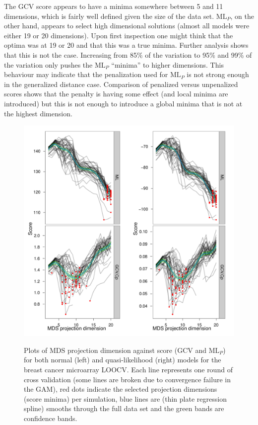 The GCV score appears to have a minima somewhere between 5 and 11 dimensions, which is fairly well defined given the size of the data set.  $\text{ML}_P$, on the other hand, appears to select high dimensional solutions (almost all models were either 19 or 20 dimensions). Upon first inspection one might think that the optima was at 19 or 20 and that this was a true minima. Further analysis shows that this is not the case. Increasing from 85\% of the variation to 95\% and 99\% of the variation only pushes the $\text{ML}_P$ ``minima'' to higher dimensions. This behaviour may indicate that the penalization used for $\text{ML}_P$ is not strong enough in the generalized distance case. Comparison of penalized versus unpenalized scores shows that the penalty is having some effect (and local minima are introduced) but this is not enough to introduce a global minima that is not at the highest dimension.

\begin{figure}
\centering
\includegraphics[width=6in]{gds/figs/breastcancer-dimselect.pdf} \\
\caption{Plots of MDS projection dimension against score (GCV and $\text{ML}_P$) for both normal (left) and quasi-likelihood (right) models for the breast cancer microarray LOOCV. Each line represents one round of cross validation (some lines are broken due to convergence failure in the GAM), red dots indicate the selected projection dimensions (score minima) per simulation, blue lines are (thin plate regression spline) smooths through the full data set and the green bands are confidence bands.}
\label{breastcancer-dimselect}
\end{figure}

